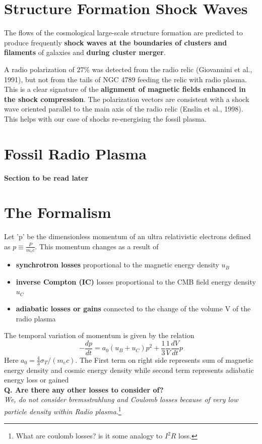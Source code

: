\documentclass[11pt]{report}
\newcommand{\tbf}[1]{\textbf{#1}}
\newcommand{\tit}[1]{\textit{#1}}
\newcommand{\fn}[1]{\footnote{#1}}
\newcommand{\de}[2]{\frac{d{#1}}{d{#2}}}
\newcommand{\cbox}{tcolorbox}
\begin{document}
\section{Structure Formation Shock Waves}
The flows of the cosmological large-scale structure formation are predicted to produce frequently \tbf{shock waves at the boundaries of clusters and filaments} of galaxies and \tbf{during cluster merger}. 
\begin{\cbox}
 A radio polarization of $27\%$ was detected from the radio relic (Giovannini et al., 1991), but not from the tails of NGC 4789 feeding the relic with radio plasma. This is a clear signature of the \textbf{alignment of magnetic fields enhanced in the shock compression}. The polarization vectors are consistent with a shock wave oriented parallel to the main axis of the radio relic (Enslin et al., 1998). This helps with our case of shocks re-energising the fossil plasma.
\end{\cbox}
\section{Fossil Radio Plasma}
\textbf{Section to be read later}
\section{The Formalism}
Let 'p' be the dimensionless momentum of an ultra relativistic electrons defined as $p\equiv \frac{P}{m_e c}$. This momentum changes as a result of 
\begin{itemize}
\item \tbf{synchrotron losses} proportional to the magnetic energy density $u_B$
\item \tbf{inverse Compton (IC)} losses proportional to the CMB field energy density $u_C$
\item \tbf{adiabatic losses or gains} connected to the change of the volume V of the radio plasma
\end{itemize}
The temporal variation of momentum is  given by the relation
\begin{equation}\label{eqp}
-\de{p}{t}=a_0(u_B+u_C)p^2 +\frac{1}{3}\frac{1}{V}\de{V}{t}p
\end{equation}
Here $a_0=\frac{4}{3}\sigma_T/(m_ec)$. The First term on right side represents sum of magnetic energy density and cosmic energy density while second term represents adiabatic energy loss or gained\\

\tbf{Q. Are there any other losses to consider of?}\\
\tit{We, do not consider bremsstrahlung and Coulomb losses because of very low particle density within Radio plasma}.\fn{What are coulomb losses? is it some analogy to $I^2R$ loss.}\\
\end{document}

